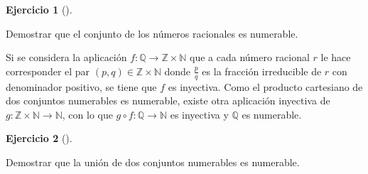\documentclass[
  a4paper,
]{scrreport}
\theoremstyle{definition}
\newtheorem{exercise}{Ejercicio}[chapter]
\theoremstyle{remark}
\begin{document}
\leavevmode{}%
\begin{exercise}[]\label{exr-racionales-numerables}

Demostrar que el conjunto de los números racionales es numerable.

\end{exercise}

\begin{tcolorbox}[enhanced jigsaw, breakable, title=\textcolor{quarto-callout-tip-color}{\faLightbulb}\hspace{0.5em}{Solución}, left=2mm, leftrule=.75mm, colback=white, bottomtitle=1mm, coltitle=black, bottomrule=.15mm, colframe=quarto-callout-tip-color-frame, colbacktitle=quarto-callout-tip-color!10!white, rightrule=.15mm, opacitybacktitle=0.6, arc=.35mm, toprule=.15mm, opacityback=0, toptitle=1mm, titlerule=0mm]
Si se considera la aplicación
\(f:\mathbb{Q}\to \mathbb{Z}\times \mathbb{N}\) que a cada número
racional \(r\) le hace corresponder el par
\((p,q)\in \mathbb{Z}\times \mathbb{N}\) donde \(\frac{p}{q}\) es la
fracción irreducible de \(r\) con denominador positivo, se tiene que
\(f\) es inyectiva. Como el producto cartesiano de dos conjuntos
numerables es numerable, existe otra aplicación inyectiva de
\(g:\mathbb{Z}\times \mathbb{N}\to \mathbb{N}\), con lo que
\(g\circ f:\mathbb{Q}\to\mathbb{N}\) es inyectiva y \(\mathbb{Q}\) es
numerable.
\end{tcolorbox}

\leavevmode{}%
\begin{exercise}[]\label{exr-union-numerables}

Demostrar que la unión de dos conjuntos numerables es numerable.

\end{exercise}
\end{document}
